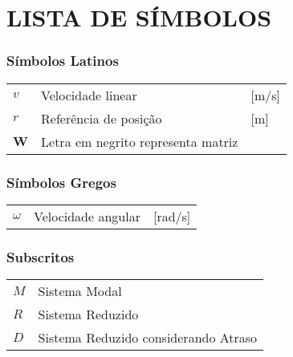 




\chapter*{LISTA DE SÍMBOLOS}



\subsection*{Símbolos Latinos}

\begin{tabular}{p{}p{}>{\PreserveBacklash\raggedleft}p{}}
$v$  & Velocidade linear  & {[}m/s{]}\tabularnewline
$r$ & Referência de posição & {[}m{]}\tabularnewline
$\mathbf{W}$ & Letra em negrito representa matriz & \tabularnewline
\end{tabular}

\subsection*{Símbolos Gregos}

\begin{tabular}{p{}p{}>{\PreserveBacklash\raggedleft}p{}}
$\omega$ & Velocidade angular & {[}rad/s{]}\tabularnewline
\end{tabular}


\subsection*{Subscritos}

\begin{tabular}{p{}p{}}
$M$ & Sistema Modal\tabularnewline
$R$ & Sistema Reduzido\tabularnewline
$D$ & Sistema Reduzido considerando Atraso\tabularnewline
\end{tabular}


